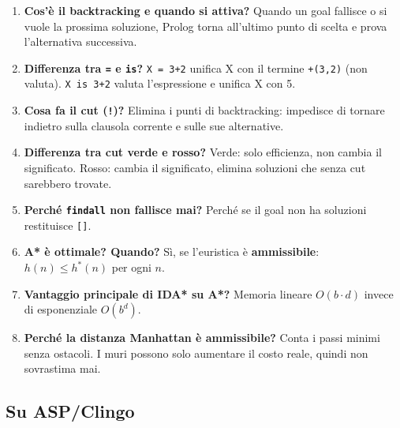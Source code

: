 \documentclass[12pt,a4paper]{article}
\begin{document}
\begin{enumerate}
  \item \textbf{Cos'è il backtracking e quando si attiva?}
        Quando un goal fallisce o si vuole la prossima soluzione, Prolog torna
        all'ultimo punto di scelta e prova l'alternativa successiva.

  \item \textbf{Differenza tra \texttt{=} e \texttt{is}?}
        \texttt{X = 3+2} unifica X con il termine \texttt{+(3,2)} (non valuta).
        \texttt{X is 3+2} valuta l'espressione e unifica X con 5.

  \item \textbf{Cosa fa il cut (\texttt{!})?}
        Elimina i punti di backtracking: impedisce di tornare indietro sulla
        clausola corrente e sulle sue alternative.

  \item \textbf{Differenza tra cut verde e rosso?}
        Verde: solo efficienza, non cambia il significato. Rosso: cambia il
        significato, elimina soluzioni che senza cut sarebbero trovate.

  \item \textbf{Perché \texttt{findall} non fallisce mai?}
        Perché se il goal non ha soluzioni restituisce \texttt{[]}.

  \item \textbf{A* è ottimale? Quando?}
        Sì, se l'euristica è \textbf{ammissibile}: $h(n) \le h^*(n)$ per ogni $n$.

  \item \textbf{Vantaggio principale di IDA* su A*?}
        Memoria lineare $O(b \cdot d)$ invece di esponenziale $O(b^d)$.

  \item \textbf{Perché la distanza Manhattan è ammissibile?}
        Conta i passi minimi senza ostacoli. I muri possono solo aumentare il
        costo reale, quindi non sovrastima mai.
\end{enumerate}

\subsection{Su ASP/Clingo}
\end{document}
